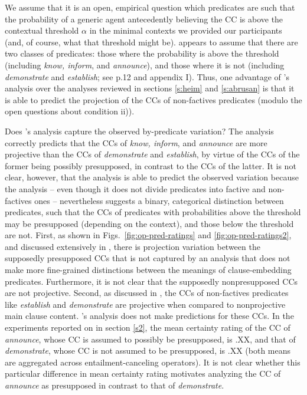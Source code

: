 \documentclass[a4paper,12pt,twoside]{article}
\newcommand{\poscite}[1]{\citeauthor{#1}'s \citeyear{#1}}
\begin{document}
We assume that it is an open, empirical question which predicates are such that the probability of a generic agent antecedently believing the CC is above the contextual threshold $\alpha$ in the minimal contexts we provided our participants (and, of course, what that threshold might be). \citealt{schlenker_triggering_2021} appears to assume that there are two classes of predicates: those where the probability is above the threshold (including {\em know, inform}, and {\em announce}), and those where it is not (including {\em demonstrate} and {\em establish}; see p.12 and appendix I). Thus, one advantage of \poscite{schlenker_triggering_2021} analysis over the analyses reviewed in sections \ref{s:heim} and \ref{s:abrusan} is that it is able to predict the projection of the CCs of non-factives predicates (modulo the open questions about condition ii)). 

Does \poscite{schlenker_triggering_2021} analysis capture the observed by-predicate variation? The analysis correctly predicts that the CCs of \emph{know, inform}, and \emph{announce} are more projective than the CCs of \emph{demonstrate} and \emph{establish}, by virtue of the CCs of the former being possibly presupposed, in contrast to the CCs of the latter. It is not clear, however, that the analysis is able to predict the observed variation because the analysis -- even  though it does not divide predicates into factive and non-factives ones -- nevertheless suggests a binary, categorical distinction between predicates, such that the CCs of predicates with probabilities above the threshold may be presupposed (depending on the context), and those below the threshold are not. First, as shown in Figs.~\ref{fig:op-pred-ratings} and \ref{fig:op-pred-ratings2}, and discussed extensively in \citealt{degen_are_2022}, there is projection variation between the supposedly presupposed CCs that is not captured by an analysis that does not make more fine-grained distinctions between the meanings of clause-embedding predicates. Furthermore, it is not clear that the supposedly nonpresupposed CCs are not projective. Second, as discussed in \citealt{degen_are_2022}, the CCs of non-factives predicates like \emph{establish} and \emph{demonstrate} are projective when compared to nonprojective main clause content. \poscite{schlenker_triggering_2021} analysis does not make predictions for these CCs. In the experiments reported on in section \ref{s2}, the mean certainty rating of the CC of \emph{announce}, whose CC is assumed to possibly be presupposed, is .XX, and that of {\em demonstrate}, whose CC is not assumed to be presupposed, is .XX (both means are aggregated across entailment-canceling operators). It is not clear whether this particular difference in mean certainty rating motivates analyzing the CC of \emph{announce} as presupposed in contrast to that of \emph{demonstrate}.
\end{document}
